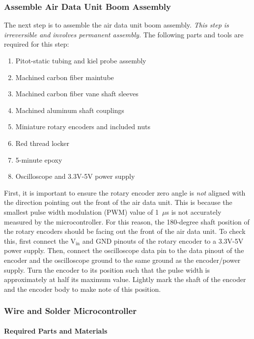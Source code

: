 \documentclass[10pt,onecolumn]{article}
\begin{document}
		\subsubsection{Assemble Air Data Unit Boom Assembly}
		
			The next step is to assemble the air data unit boom assembly. \emph{This step is irreversible and involves permanent assembly.} The following parts and tools are required for this step:
			\begin{enumerate}
				\item Pitot-static tubing and kiel probe assembly
				\item Machined carbon fiber maintube 
				\item Machined carbon fiber vane shaft sleeves
				\item Machined aluminum shaft couplings
				\item Miniature rotary encoders and included nuts
				\item Red thread locker
				\item 5-minute epoxy
				\item Oscilloscope and 3.3V-5V power supply
			\end{enumerate}
		
			First, it is important to ensure the rotary encoder zero angle is \emph{not} aligned with the direction pointing out the front of the air data unit. This is because the smallest pulse width modulation (PWM) value of 1~$\mu$s is not accurately measured by the microcontroller. For this reason, the 180-degree shaft position of the rotary encoders should be facing out the front of the air data unit. To check this, first connect the $\mathrm{V_{in}}$ and GND pinouts of the rotary encoder to a 3.3V-5V power supply. Then, connect the oscilloscope data pin to the data pinout of the encoder and the oscilloscope ground to the same ground as the encoder/power supply. Turn the encoder to its position such that the pulse width is approximately at half its maximum value. Lightly mark the shaft of the encoder and the encoder body to make note of this position. 
			
		\subsubsection{Wire and Solder Microcontroller}
		
			\paragraph{Required Parts and Materials}
			
\end{document}
